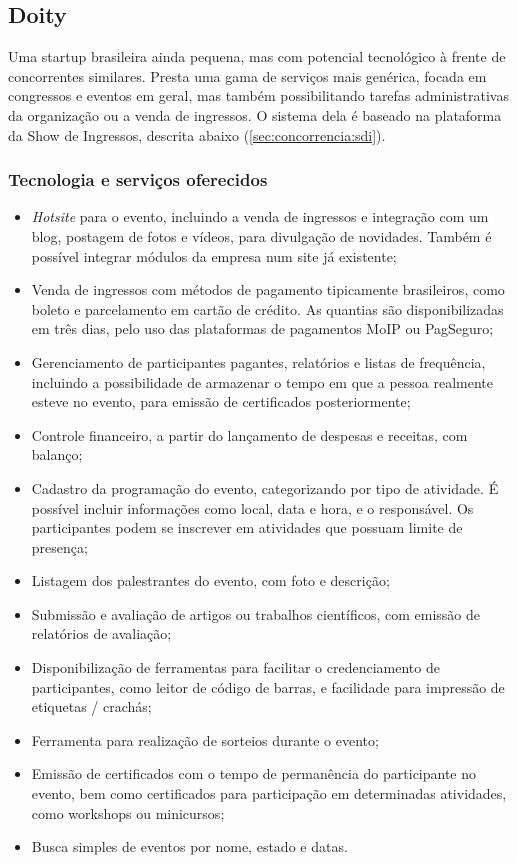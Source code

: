 \documentclass[12pt,a4paper,twoside,hyphens,english,brazil]{abntex2}
\begin{document}
\subsection{Doity} \label{sec:concorrencia:doity:tec}
Uma startup brasileira ainda pequena, mas com potencial tecnológico à frente de concorrentes similares. Presta uma gama de serviços mais genérica, focada em congressos e eventos em geral, mas também possibilitando tarefas administrativas da organização ou a venda de ingressos.\cite{doity-como-funciona} O sistema dela é baseado na plataforma da Show de Ingressos, descrita abaixo (\autoref{sec:concorrencia:sdi}).

\subsubsection*{Tecnologia e serviços oferecidos}
\begin{itemize}[itemsep=-1ex]
	\item \emph{Hotsite} para o evento, incluindo a venda de ingressos e integração com um blog, postagem de fotos e vídeos, para divulgação de novidades. Também é possível integrar módulos da empresa num site já existente;
	\item Venda de ingressos com métodos de pagamento tipicamente brasileiros, como boleto e parcelamento em cartão de crédito. As quantias são disponibilizadas em três dias, pelo uso das plataformas de pagamentos MoIP ou PagSeguro;
	\item Gerenciamento de participantes pagantes, relatórios e listas de frequência, incluindo a possibilidade de armazenar o tempo em que a pessoa realmente esteve no evento, para emissão de certificados posteriormente;
	\item Controle financeiro, a partir do lançamento de despesas e receitas, com balanço;
	\item Cadastro da programação do evento, categorizando por tipo de atividade. É possível incluir informações como local, data e hora, e o responsável. Os participantes podem se inscrever em atividades que possuam limite de presença;
	\item Listagem dos palestrantes do evento, com foto e descrição;
	\item Submissão e avaliação de artigos ou trabalhos científicos, com emissão de relatórios de avaliação;
	\item Disponibilização de ferramentas para facilitar o credenciamento de participantes, como leitor de código de barras, e facilidade para impressão de etiquetas / crachás;
	\item Ferramenta para realização de sorteios durante o evento;
	\item Emissão de certificados com o tempo de permanência do participante no evento, bem como certificados para participação em determinadas atividades, como workshops ou minicursos;
	\item Busca simples de eventos por nome, estado e datas.
\end{itemize}
\end{document}

